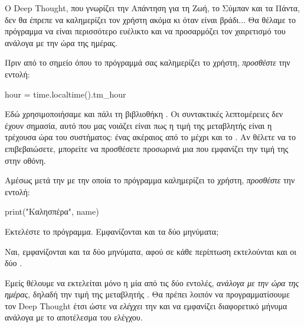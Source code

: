 \documentclass[a4paper,11pt,oneside]{book}
\begin{document}
Ο Deep Thought, που γνωρίζει την Απάντηση για τη Ζωή, το Σύμπαν και τα Πάντα, δεν θα έπρεπε να καλημερίζει τον χρήστη ακόμα κι όταν είναι βράδι... Θα θέλαμε το πρόγραμμα να είναι περισσότερο ευέλικτο και να προσαρμόζει τον χαιρετισμό του ανάλογα με την ώρα της ημέρας.

\begin{step}
\label{step:hour-assign}
Πριν από το σημείο όπου το πρόγραμμά σας καλημερίζει το χρήστη, \emph{προσθέστε} την εντολή:

\begin{pynew}
hour = time.localtime().tm_hour
\end{pynew}

Εδώ χρησιμοποιήσαμε και πάλι τη βιβλιοθήκη . 
Οι συντακτικές λεπτομέρειες δεν έχουν σημασία, αυτό που μας νοιάζει είναι πως η τιμή της μεταβλητής  είναι η τρέχουσα ώρα του συστήματος: ένας ακέραιος από το  μέχρι και το . Αν θέλετε να το επιβεβαιώσετε, μπορείτε να προσθέσετε προσωρινά μια  που εμφανίζει την τιμή της  στην οθόνη.
\end{step}

\begin{step}
Αμέσως μετά την  με την οποία
το πρόγραμμα καλημερίζει το χρήστη, \emph{προσθέστε} την εντολή:

\begin{pynew}
print("Καλησπέρα", name)
\end{pynew}

Εκτελέστε το πρόγραμμα. Εμφανίζονται και τα δύο μηνύματα;  

\begin{answer}
Ναι, εμφανίζονται και τα δύο μηνύματα, αφού σε κάθε περίπτωση εκτελούνται και οι δύο .
\end{answer}

Εμείς θέλουμε να εκτελείται μόνο η μία από τις δύο εντολές, \emph{ανάλογα με την ώρα της ημέρας}, δηλαδή την τιμή της μεταβλητής . Θα πρέπει λοιπόν να προγραμματίσουμε τον Deep Thought έτσι ώστε να \emph{ελέγχει} την  και να εμφανίζει διαφορετικό μήνυμα ανάλογα με το αποτέλεσμα του ελέγχου. 
\end{step}
\end{document}
